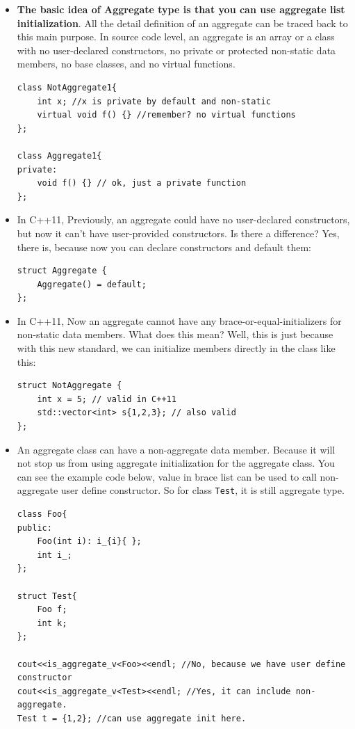 \documentclass[a4paper,11pt,twoside]{book}
\begin{document}
\begin{itemize}
	
	\item \textbf{The basic idea of Aggregate type is that you can use aggregate list initialization}. All the detail definition of an aggregate can be traced back to this main purpose. In source code level, an aggregate is an array or a class with no user-declared constructors, no private or protected non-static data members, no base classes, and no virtual functions.
\begin{lstlisting}[numbers=none]
class NotAggregate1{
	int x; //x is private by default and non-static
	virtual void f() {} //remember? no virtual functions
};
		
class Aggregate1{
private:
	void f() {} // ok, just a private function
};
\end{lstlisting}

	\item In C++11, Previously, an aggregate could have no user-declared constructors, but now it can't have user-provided constructors. Is there a difference? Yes, there is, because now you can declare constructors and default them:
\begin{lstlisting}[numbers=none]
struct Aggregate {
	Aggregate() = default; 
};
\end{lstlisting}

	\item In C++11, Now an aggregate cannot have any brace-or-equal-initializers for non-static data members. What does this mean? Well, this is just because with this new standard, we can initialize members directly in the class like this:
\begin{lstlisting}[numbers=none]
struct NotAggregate {
	int x = 5; // valid in C++11
	std::vector<int> s{1,2,3}; // also valid
};
\end{lstlisting}

	\item  An aggregate class can have a non-aggregate data member. Because it will not stop us from using aggregate initialization for the aggregate class. You can see the example code below, value in brace list can be used to call non-aggregate user define constructor. So for class \texttt{Test}, it is still aggregate type.
\begin{lstlisting}[]
class Foo{
public:
    Foo(int i): i_{i}{ };
    int i_;
};

struct Test{
    Foo f;
    int k;
};

cout<<is_aggregate_v<Foo><<endl; //No, because we have user define constructor
cout<<is_aggregate_v<Test><<endl; //Yes, it can include non-aggregate.
Test t = {1,2}; //can use aggregate init here.
\end{lstlisting}


\end{itemize}
\end{document}
